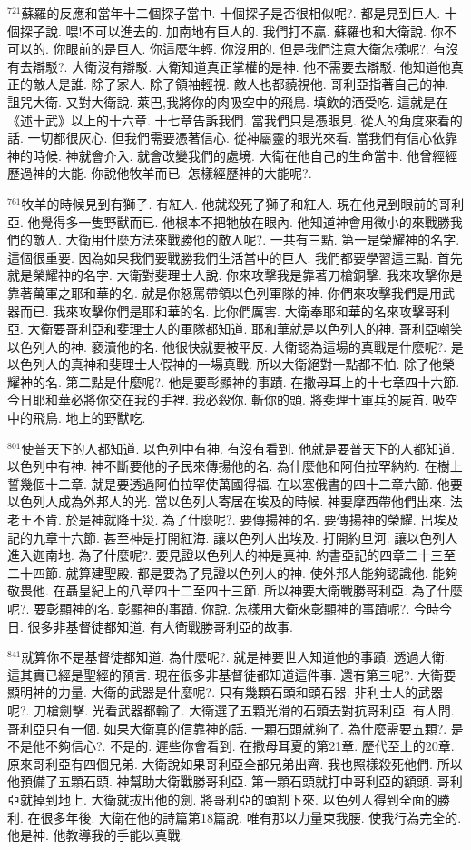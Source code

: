 \documentclass{book}
\begin{document}
$^{721}$蘇羅的反應和當年十二個探子當中.
十個探子是否很相似呢?.
都是見到巨人.
十個探子說.
喂!不可以進去的.
加南地有巨人的.
我們打不贏.
蘇羅也和大衛說.
你不可以的.
你眼前的是巨人.
你這麼年輕.
你沒用的.
但是我們注意大衛怎樣呢?.
有沒有去辯駁?.
大衛沒有辯駁.
大衛知道真正掌權的是神.
他不需要去辯駁.
他知道他真正的敵人是誰.
除了家人.
除了領袖輕視.
敵人也都藐視他.
哥利亞指著自己的神.
詛咒大衛.
又對大衛說.
萊巴,我將你的肉吸空中的飛鳥.
填飲的酒受吃.
這就是在《述十武》以上的十六章.
十七章告訴我們.
當我們只是憑眼見.
從人的角度來看的話.
一切都很灰心.
但我們需要憑著信心.
從神屬靈的眼光來看.
當我們有信心依靠神的時候.
神就會介入.
就會改變我們的處境.
大衛在他自己的生命當中.
他曾經經歷過神的大能.
你說他牧羊而已.
怎樣經歷神的大能呢?.

$^{761}$牧羊的時候見到有獅子.
有紅人.
他就殺死了獅子和紅人.
現在他見到眼前的哥利亞.
他覺得多一隻野獸而已.
他根本不把牠放在眼內.
他知道神會用微小的來戰勝我們的敵人.
大衛用什麼方法來戰勝他的敵人呢?.
一共有三點.
第一是榮耀神的名字.
這個很重要.
因為如果我們要戰勝我們生活當中的巨人.
我們都要學習這三點.
首先就是榮耀神的名字.
大衛對斐理士人說.
你來攻擊我是靠著刀槍銅擊.
我來攻擊你是靠著萬軍之耶和華的名.
就是你怒罵帶領以色列軍隊的神.
你們來攻擊我們是用武器而已.
我來攻擊你們是耶和華的名.
比你們厲害.
大衛奉耶和華的名來攻擊哥利亞.
大衛要哥利亞和斐理士人的軍隊都知道.
耶和華就是以色列人的神.
哥利亞嘲笑以色列人的神.
褻瀆他的名.
他很快就要被平反.
大衛認為這場的真戰是什麼呢?.
是以色列人的真神和斐理士人假神的一場真戰.
所以大衛絕對一點都不怕.
除了他榮耀神的名.
第二點是什麼呢?.
他是要彰顯神的事蹟.
在撒母耳上的十七章四十六節.
今日耶和華必將你交在我的手裡.
我必殺你.
斬你的頭.
將斐理士軍兵的屍首.
吸空中的飛鳥.
地上的野獸吃.

$^{801}$使普天下的人都知道.
以色列中有神.
有沒有看到.
他就是要普天下的人都知道.
以色列中有神.
神不斷要他的子民來傳揚他的名.
為什麼他和阿伯拉罕納約.
在樹上誓幾個十二章.
就是要透過阿伯拉罕使萬國得福.
在以塞俄書的四十二章六節.
他要以色列人成為外邦人的光.
當以色列人寄居在埃及的時候.
神要摩西帶他們出來.
法老王不肯.
於是神就降十災.
為了什麼呢?.
要傳揚神的名.
要傳揚神的榮耀.
出埃及記的九章十六節.
甚至神是打開紅海.
讓以色列人出埃及.
打開約旦河.
讓以色列人進入迦南地.
為了什麼呢?.
要見證以色列人的神是真神.
約書亞記的四章二十三至二十四節.
就算建聖殿.
都是要為了見證以色列人的神.
使外邦人能夠認識他.
能夠敬畏他.
在聶皇紀上的八章四十二至四十三節.
所以神要大衛戰勝哥利亞.
為了什麼呢?.
要彰顯神的名.
彰顯神的事蹟.
你說.
怎樣用大衛來彰顯神的事蹟呢?.
今時今日.
很多非基督徒都知道.
有大衛戰勝哥利亞的故事.

$^{841}$就算你不是基督徒都知道.
為什麼呢?.
就是神要世人知道他的事蹟.
透過大衛.
這其實已經是聖經的預言.
現在很多非基督徒都知道這件事.
還有第三呢?.
大衛要顯明神的力量.
大衛的武器是什麼呢?.
只有幾顆石頭和頭石器.
非利士人的武器呢?.
刀槍劍擊.
光看武器都輸了.
大衛選了五顆光滑的石頭去對抗哥利亞.
有人問.
哥利亞只有一個.
如果大衛真的信靠神的話.
一顆石頭就夠了.
為什麼需要五顆?.
是不是他不夠信心?.
不是的.
遲些你會看到.
在撒母耳夏的第21章.
歷代至上的20章.
原來哥利亞有四個兄弟.
大衛說如果哥利亞全部兄弟出齊.
我也照樣殺死他們.
所以他預備了五顆石頭.
神幫助大衛戰勝哥利亞.
第一顆石頭就打中哥利亞的額頭.
哥利亞就掉到地上.
大衛就拔出他的劍.
將哥利亞的頭割下來.
以色列人得到全面的勝利.
在很多年後.
大衛在他的詩篇第18篇說.
唯有那以力量束我腰.
使我行為完全的.
他是神.
他教導我的手能以真戰.
\end{document}
